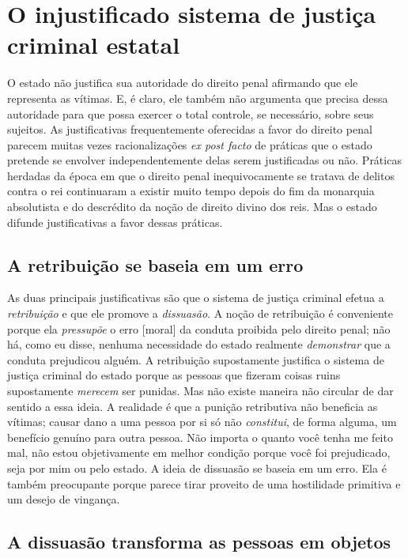 \section{O injustificado sistema de justiça criminal estatal}

O estado não justifica sua autoridade do direito penal afirmando que ele representa as vítimas. E, é claro, ele também não argumenta que precisa dessa autoridade para que possa exercer o total controle, se necessário, sobre seus sujeitos. As justificativas frequentemente oferecidas a favor do direito penal parecem muitas vezes racionalizações \emph{ex post facto} de práticas que o estado pretende se envolver independentemente delas serem justificadas ou não. Práticas herdadas da época em que o direito penal inequivocamente se tratava de delitos contra o rei continuaram a existir muito tempo depois do fim da monarquia absolutista e do descrédito da noção de direito divino dos reis. Mas o estado difunde justificativas a favor dessas práticas.

\subsection*{A retribuição se baseia em um erro}

As duas principais justificativas são que o sistema de justiça criminal efetua a \emph{retribuição} e que ele promove a \emph{dissuasão}. A noção de retribuição é conveniente porque ela \emph{pressupõe} o erro [moral] da conduta proibida pelo direito penal; não há, como eu disse, nenhuma necessidade do estado realmente \emph{demonstrar} que a conduta prejudicou alguém. A retribuição supostamente justifica o sistema de justiça criminal do estado porque as pessoas que fizeram coisas ruins supostamente \emph{merecem} ser punidas. Mas não existe maneira não circular de dar sentido a essa ideia. A realidade é que a punição retributiva não beneficia as vítimas; causar dano a uma pessoa por si só não \emph{constitui}, de forma alguma, um benefício genuíno para outra pessoa. Não importa o quanto você tenha me feito mal, não estou objetivamente em melhor condição porque você foi prejudicado, seja por mim ou pelo estado. A ideia de dissuasão se baseia em um erro. Ela é também preocupante porque parece tirar proveito de uma hostilidade primitiva e um desejo de vingança.

\subsection*{A dissuasão transforma as pessoas em objetos}

